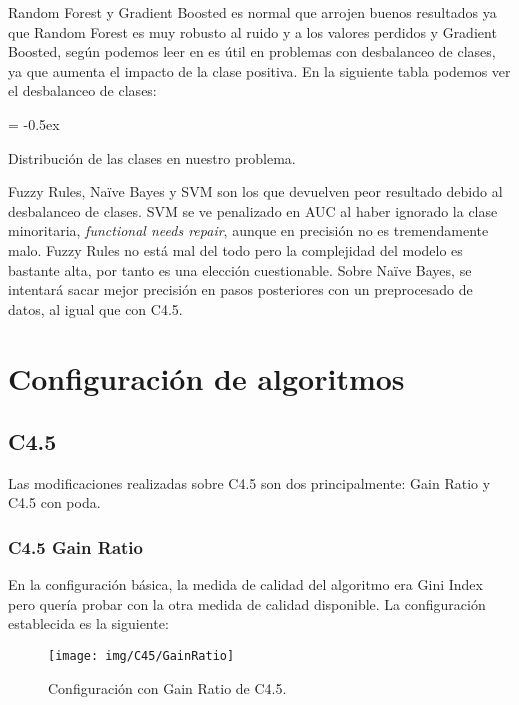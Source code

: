 \documentclass[paper=a4, fontsize=12pt]{article} %
\numberwithin{equation}{section} %
\numberwithin{figure}{section} %
\numberwithin{table}{section} %
\begin{document}
Random Forest y Gradient Boosted es normal que arrojen buenos resultados ya que Random Forest es muy robusto al ruido y a los valores perdidos y Gradient Boosted, según podemos leer en \cite{unbalanced} es útil en problemas con desbalanceo de clases, ya que aumenta el impacto de la clase positiva. En la siguiente tabla podemos ver el desbalanceo de clases:

	\extrarowheight = -0.5ex %
	\renewcommand{\arraystretch}{1.75} %
	\begin{table}[H]
		\begin{center}
		\end{center}
		\caption {Distribución de las clases en nuestro problema.}
		\label {datadistribution}
	\end{table}

Fuzzy Rules, Naïve Bayes y SVM son los que devuelven peor resultado debido al desbalanceo de clases. SVM se ve penalizado en AUC al haber ignorado la clase minoritaria, \textit{functional needs repair}, aunque en precisión no es tremendamente malo. Fuzzy Rules no está mal del todo pero la complejidad del modelo es bastante alta, por tanto es una elección cuestionable. Sobre Naïve Bayes, se intentará sacar mejor precisión en pasos posteriores con un preprocesado de datos, al igual que con C4.5.

\section{Configuración de algoritmos}
\subsection {C4.5}
Las modificaciones realizadas sobre C4.5 son dos principalmente: Gain Ratio y C4.5 con poda.
\subsubsection {C4.5 Gain Ratio}
En la configuración básica, la medida de calidad del algoritmo era Gini Index pero quería probar con la otra medida de calidad disponible. La configuración establecida es la siguiente:

	\begin{figure}[H]
	  \centering
	  \texttt{[image: img/C45/GainRatio]}
	  \caption{Configuración con Gain Ratio de C4.5.}
	  \label{gainratioC45}
	\end{figure}
\end{document}

